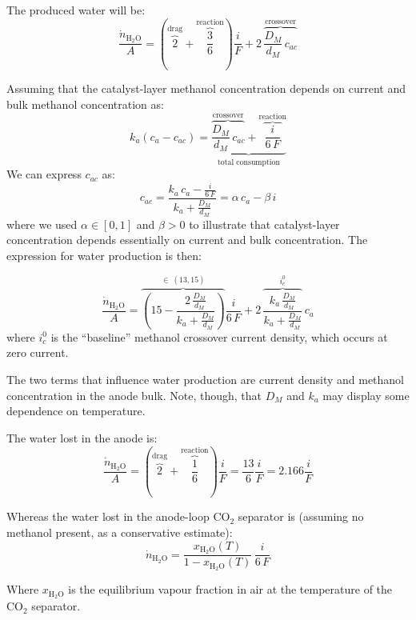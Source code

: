\documentclass[a4paper,10pt]{article}
\newcommand{\HHO}{\ensuremath{\mathrm{H_2O}}}
\newcommand{\COO}{\ensuremath{\mathrm{CO_2}}}
\begin{document}
The produced water will be:
\begin{equation}
\frac{\dot n_\HHO}{A} = \left( \overbrace{2}^\text{drag} +
\overbrace{\frac{3}{6}}^\text{reaction} \right) \frac{i}{F} +
2\,\overbrace{\frac{D_M}{d_M}\,c_{ac}}^\text{crossover}
\end{equation}

Assuming that the catalyst-layer methanol concentration depends on current and
bulk methanol concentration as:
\begin{equation}
k_a(c_a-c_{ac}) = \underbrace{
\overbrace{\frac{D_M}{d_M}\,c_{ac}}^\text{crossover} +
\overbrace{\frac{i}{6\,F}}^\text{reaction}
}_\text{total consumption}
\end{equation}
We can express $c_{ac}$ as:
\begin{equation}
c_{ac} = \frac{k_a\,c_a - \frac{i}{6\,F}}{k_a+\frac{D_M}{d_M}}
= \alpha \, c_a - \beta \,i
\end{equation}
where we used $\alpha \in [0,1]$ and $\beta>0$ to illustrate that catalyst-layer
concentration depends essentially on current and bulk concentration.
The expression for water production is then:

\begin{equation}
\boxed{
\frac{\dot n_\HHO}{A} = \overbrace{\left(15 - \frac{2\,\frac{D_M}{d_M}}{k_a+
\frac{D_M}{d_M}}\right)}^{\in~(13,15)} \frac{i}{6\,F} +
2\,\overbrace{\frac{k_a\,\frac{D_M}{d_M}}{k_a+\frac{D_M}{d_M}}}^{i_c^0} \, c_a
}
\end{equation}
where $i_c^0$ is the ``baseline'' methanol crossover current density, which
occurs at zero current.

The two terms that influence water production are current density and
methanol concentration in the anode bulk. Note, though, that $D_M$ and $k_a$ may
display some dependence on temperature.

The water lost in the anode is:
\begin{equation}
\frac{\dot n_\HHO}{A} = \left( \overbrace{2}^\text{drag} +
\overbrace{\frac{1}{6}}^\text{reaction} \right) \frac{i}{F}=
\frac{13}{6}\frac{i}{F} = 2.166 \frac{i}{F}
\end{equation}

Whereas the water lost in the anode-loop \COO{} separator is (assuming no
methanol present, as a conservative estimate):
\begin{equation}
\dot n_\HHO = \frac{x_\HHO(T)}{1-x_\HHO(T)}\,\frac{i}{6\,F}
\end{equation}

Where $x_\HHO$ is the equilibrium vapour fraction in air at the temperature
of the \COO{} separator.
\end{document}
